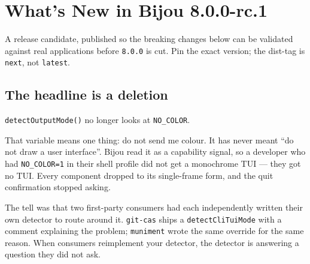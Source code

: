 \chapter{What's New in Bijou 8.0.0-rc.1}\label{record-284}

\smallskip

A release candidate, published so the breaking changes below can be validated against real applications before \texttt{8\allowbreak{}.\allowbreak{}0\allowbreak{}.\allowbreak{}0} is cut. Pin the exact version; the dist-tag is \texttt{n\allowbreak{}e\allowbreak{}x\allowbreak{}t}, not \texttt{l\allowbreak{}a\allowbreak{}t\allowbreak{}e\allowbreak{}s\allowbreak{}t}.

\section{The headline is a deletion}\label{record-284-the-headline-is-a-deletion}

\texttt{d\allowbreak{}e\allowbreak{}t\allowbreak{}e\allowbreak{}c\allowbreak{}t\allowbreak{}O\allowbreak{}u\allowbreak{}t\allowbreak{}p\allowbreak{}u\allowbreak{}t\allowbreak{}M\allowbreak{}o\allowbreak{}d\allowbreak{}e\allowbreak{}(\allowbreak{})} no longer looks at \texttt{N\allowbreak{}O\allowbreak{}\_\allowbreak{}C\allowbreak{}O\allowbreak{}L\allowbreak{}O\allowbreak{}R}.

That variable means one thing: do not send me colour. It has never meant ``do not draw a user interface''. Bijou read it as a capability signal, so a developer who had \texttt{N\allowbreak{}O\allowbreak{}\_\allowbreak{}C\allowbreak{}O\allowbreak{}L\allowbreak{}O\allowbreak{}R\allowbreak{}=\allowbreak{}1} in their shell profile did not get a monochrome TUI --- they got no TUI. Every component dropped to its single-frame form, and the quit confirmation stopped asking.

The tell was that two first-party consumers had each independently written their own detector to route around it. \texttt{g\allowbreak{}i\allowbreak{}t\allowbreak{}-\allowbreak{}c\allowbreak{}a\allowbreak{}s} ships a \texttt{d\allowbreak{}e\allowbreak{}t\allowbreak{}e\allowbreak{}c\allowbreak{}t\allowbreak{}C\allowbreak{}l\allowbreak{}i\allowbreak{}T\allowbreak{}u\allowbreak{}i\allowbreak{}M\allowbreak{}o\allowbreak{}d\allowbreak{}e} with a comment explaining the problem; \texttt{m\allowbreak{}u\allowbreak{}n\allowbreak{}i\allowbreak{}m\allowbreak{}e\allowbreak{}n\allowbreak{}t} wrote the same override for the same reason. When consumers reimplement your detector, the detector is answering a question they did not ask.

